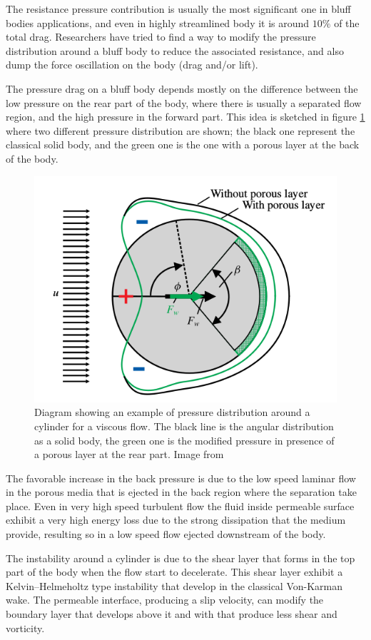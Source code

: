 The resistance pressure contribution is usually the most significant one in bluff bodies applications, and even in highly streamlined body it is around $10\%$ of the total drag.
Researchers have tried to find a way to modify the pressure distribution around a bluff body to reduce the associated resistance, and also dump the force oscillation on the body (drag and/or lift).

The pressure drag on a bluff body depends mostly on the difference between the low pressure on the rear part of the body, where there is usually a separated flow region, and the high pressure in the forward part.
This idea is sketched in figure \ref{fig:pressure_dist} where two different pressure distribution are shown; the black one represent the classical solid body, and the green one is the one with a porous layer at the back of the body.

\begin{figure}[h]
	\centering
	\includegraphics[width=0.4\linewidth]{chapter_1/pressure_dist}
	\caption{Diagram showing an example of pressure distribution around a cylinder for a viscous flow. The black line is the angular distribution as a solid body, the green one is the modified pressure in presence of a porous layer at the rear part. Image from \citet{klausmann2017drag}}
	\label{fig:pressure_dist}
\end{figure}

The favorable increase in the back pressure is due to the low speed laminar flow in the porous media that is ejected in the back region where the separation take place.
Even in very high speed turbulent flow the fluid inside permeable surface exhibit a very high energy loss due to the strong dissipation that the medium provide, resulting so in a low speed flow ejected downstream of the body.

The instability around a cylinder is due to the shear layer that forms in the top part of the body when the flow start to decelerate.
This shear layer exhibit a Kelvin–Helmeholtz type instability that develop in the classical Von-Karman wake.
The permeable interface, producing a slip velocity, can modify the boundary layer that develops above it and with that produce less shear and vorticity.


